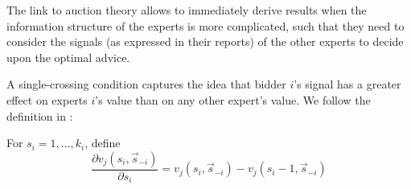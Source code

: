 The link to auction theory allows to immediately derive results when the information structure of the experts is more complicated, such that they need to consider the signals (as expressed in their reports) of the other experts to decide upon the optimal advice.







A single-crossing condition captures the idea that bidder $i$'s signal has a greater effect on experts $i$'s value than on any other expert's value. We follow the definition in \citet{eden2018interdependent}:

For $s_i = 1, \ldots, k_i$, define $$\frac{\partial v_j(s_i, \vec{s}_{-i})}{\partial s_i} = v_j(s_i, \vec{s}_{-i}) - v_j(s_i - 1, \vec{s}_{-i})$$

